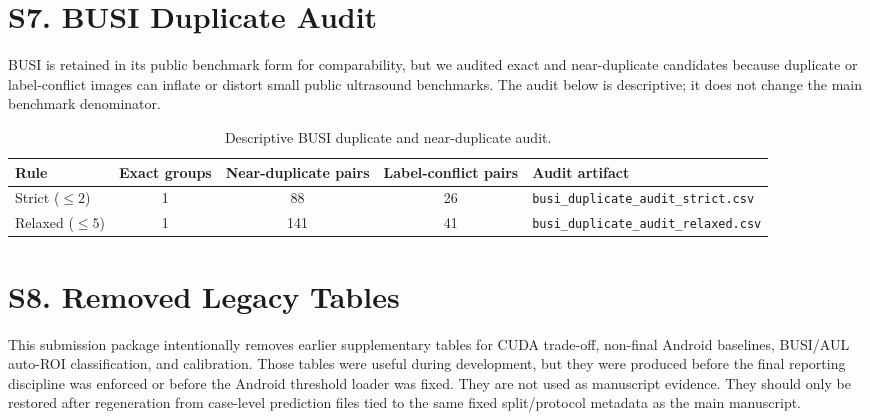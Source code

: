 \documentclass[preprint,12pt]{elsarticle}
\newcommand{\suppsection}[1]{\Needspace{0.35\textheight}\section*{#1}}
\begin{document}
\suppsection{S7. BUSI Duplicate Audit}

BUSI is retained in its public benchmark form for comparability, but we audited exact and near-duplicate candidates because duplicate or label-conflict images can inflate or distort small public ultrasound benchmarks. The audit below is descriptive; it does not change the main benchmark denominator.

\begin{table}[H]
    \centering
    \small
    \caption{Descriptive BUSI duplicate and near-duplicate audit.}
    \label{tab:s_busi_duplicate_audit}
    \begin{adjustbox}{max width=\columnwidth}
    \begin{tabular}{lcccl}
        \toprule
        Rule & Exact groups & Near-duplicate pairs & Label-conflict pairs & Audit artifact \\
        \midrule
        Strict ($\leq 2$) & 1 & 88 & 26 & \texttt{busi\_duplicate\_audit\_strict.csv} \\
        Relaxed ($\leq 5$) & 1 & 141 & 41 & \texttt{busi\_duplicate\_audit\_relaxed.csv} \\
        \bottomrule
    \end{tabular}
    \end{adjustbox}
\end{table}

\suppsection{S8. Removed Legacy Tables}

This submission package intentionally removes earlier supplementary tables for CUDA trade-off, non-final Android baselines, BUSI/AUL auto-ROI classification, and calibration. Those tables were useful during development, but they were produced before the final reporting discipline was enforced or before the Android threshold loader was fixed. They are not used as manuscript evidence. They should only be restored after regeneration from case-level prediction files tied to the same fixed split/protocol metadata as the main manuscript.
\end{document}
